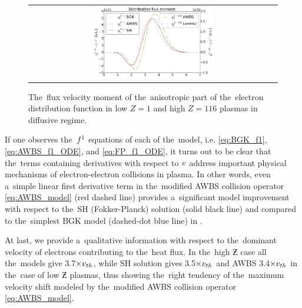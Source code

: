 \begin{figure}[tbh]
  \begin{center}
    \begin{tabular}{c}
      \includegraphics[width=0.5\textwidth]{q1s.png}
    \end{tabular}
  \caption{  
  The~flux velocity moment of the~anisotropic part of the~electron distribution 
  function in low $Z=1$ and high $Z=116$ plasmas in diffusive regime.}
  \label{fig:q1s_summary}
  \end{center} 
\end{figure}

If one observes the~$f^1$ equations of each of the~model, i.e.
\eqref{eq:BGK_f1}, \eqref{eq:AWBS_f1_ODE}, and \eqref{eq:FP_f1_ODE}, it turns
out to be clear that the~terms containing derivatives with respect to $v$ 
address important physical mechanisms of electron-electron collisions in plasma.
In other words, even a~simple linear first derivative term in the~modified
AWBS collision operator \eqref{eq:AWBS_model} (red dashed line) provides 
a~significant model improvement with respect to the~SH (Fokker-Planck) solution
(solid black line) and compared to the~simplest BGK model
(dashed-dot blue line) in .

At last, we provide a~qualitative information with respect to the~dominant 
velocity of electrons contributing to the~heat flux. In the~high $\Zbar$ case
all the~models give 3.7$\times v_{th}$, while SH solution gives 3.5$\times v_{th}$
and AWBS 3.4$\times v_{th}$ in the~case of low $\Zbar$ plasmas, thus showing 
the~right tendency of the~maximum velocity shift modeled by the~modified AWBS
collision operator \eqref{eq:AWBS_model}.


